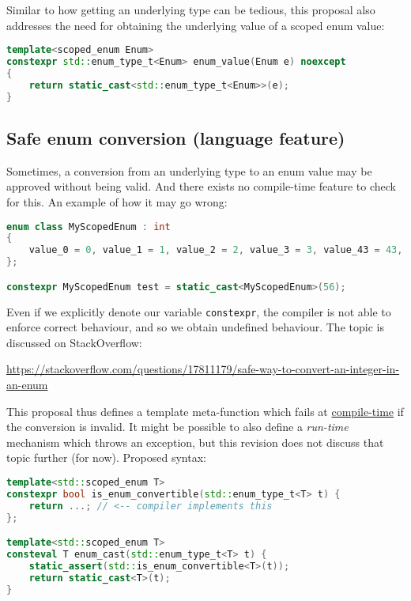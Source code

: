 \documentclass[
  format=manuscript,
  screen=true,
  review=false,
  nonacm=true,
  timestamp=true,
  balance=false]{acmart}
\begin{document}
Similar to how getting an underlying type can be tedious, this proposal also
addresses the need for obtaining the underlying value of a scoped enum value:\vspace{2mm}

\begin{lstlisting}[language=Cpp]
template<scoped_enum Enum>
constexpr std::enum_type_t<Enum> enum_value(Enum e) noexcept
{
    return static_cast<std::enum_type_t<Enum>>(e);
}
\end{lstlisting}


\subsection{Safe enum conversion (language feature)}

Sometimes, a conversion from an underlying type to an enum value may be approved
without being valid. And there exists no compile-time feature to check for this.
An example of how it may go wrong:\vspace{2mm}

\begin{lstlisting}[language=Cpp]
enum class MyScopedEnum : int
{
    value_0 = 0, value_1 = 1, value_2 = 2, value_3 = 3, value_43 = 43, value_57 = 57
};

constexpr MyScopedEnum test = static_cast<MyScopedEnum>(56);
\end{lstlisting}

\noindent
Even if we explicitly denote our variable \texttt{constexpr}, the compiler is not
able to enforce correct behaviour, and so we obtain undefined behaviour. The topic
is discussed on StackOverflow:

\noindent
\url{https://stackoverflow.com/questions/17811179/safe-way-to-convert-an-integer-in-an-enum}

\vspace{3mm}\noindent
This proposal thus defines a template meta-function which fails at
\underline{compile-time} if the conversion is invalid. It might be possible to also
define a \textit{run-time} mechanism which throws an exception, but this revision
does not discuss that topic further (for now). Proposed syntax:\vspace{2mm}

\begin{lstlisting}[language=Cpp]
template<std::scoped_enum T>
constexpr bool is_enum_convertible(std::enum_type_t<T> t) {
    return ...; // <-- compiler implements this
};

template<std::scoped_enum T>
consteval T enum_cast(std::enum_type_t<T> t) {
    static_assert(std::is_enum_convertible<T>(t));
    return static_cast<T>(t);
}
\end{lstlisting}
\end{document}
